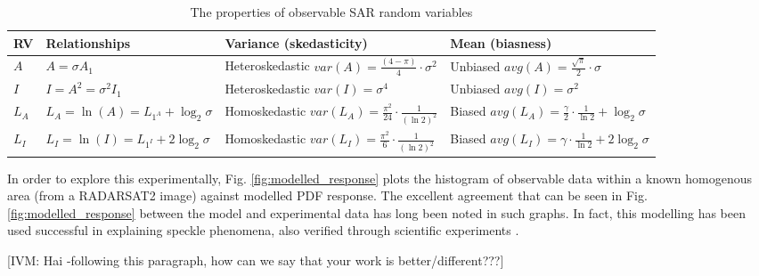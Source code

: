 \documentclass[journal]{IEEEtran}
\begin{document}
\begin{table*}[t]
\normalsize

\centering
\caption{ The properties of observable SAR random variables }
\label{tbl:sar_variables_properties}

\begin{tabular}{|l|l|l|l|}
\hline
 RV & Relationships  & Variance (skedasticity) & Mean (biasness) \\
\hline
$A$ & $A=\sigma A_1 $ & Heteroskedastic $var(A) = \frac{(4-\pi)}{4} \cdot \sigma^2 $ & Unbiased $avg(A) = \frac{\sqrt{\pi}}{2} \cdot \sigma $ \\
$I$ & $I=A^2=\sigma^2 I_1 $ & Heteroskedastic $ var(I) = \sigma^4$ & Unbiased $avg(I) = \sigma^2 $\\
$L_A$ & $L_A=\ln(A)=L_{1^A} + \log_2{\sigma}$ & Homoskedastic $var(L_A) = \frac{ \pi ^2}{24} \cdot \frac{1}{(\ln2)^2}$ & Biased $avg(L_A) = \frac{ \gamma }{2} \cdot \frac{1}{\ln2} + \log_2{\sigma}$ \\
$L_I$ & $L_I=\ln(I)=L_{1^I} + 2 \log_2{\sigma}$  & Homoskedastic $var(L_I) = \frac{ \pi ^2}{6} \cdot \frac{1}{(\ln2)^2}$ & Biased $avg(L_I) = \gamma \cdot \frac{1}{\ln2} + 2 \log_2{\sigma}  $ \\
\hline
\end{tabular}

\end{table*}

In order to explore this experimentally, Fig. \ref{fig:modelled_response} plots the histogram of observable data within a known homogenous area (from a RADARSAT2 image) against modelled PDF response. The excellent agreement that can be seen in Fig. \ref{fig:modelled_response} between the model and experimental data has long been noted in such graphs. In fact, this modelling has been used successful in explaining speckle phenomena, also verified through scientific experiments \cite{Ulaby_TGRS_1988}.

[IVM: Hai -following this paragraph, how can we say that your work is better/different???]
\end{document}
